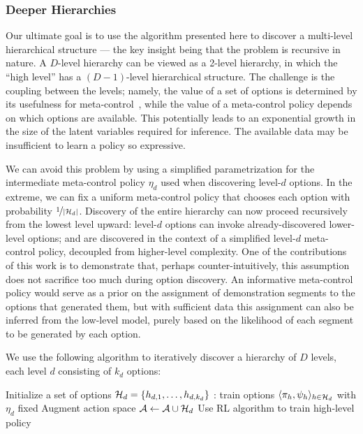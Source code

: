 \subsubsection{Deeper Hierarchies}
Our ultimate goal is to use the algorithm presented here to discover a multi-level hierarchical structure --- the key insight being that the problem is recursive in nature.
A $D$-level hierarchy can be viewed as a 2-level hierarchy, in which the ``high level'' has a $(D-1)$-level hierarchical structure. 
The challenge is the coupling between the levels; namely, the value of a set of options is determined by its usefulness for meta-control~\cite{foxMT16}, while the value of a meta-control policy depends on which options are available. This potentially leads to an exponential growth in the size of the latent variables required for inference.
The available data may be insufficient to learn a policy so expressive.

We can avoid this problem by using a simplified parametrization for the intermediate meta-control policy $\eta_d$ used when discovering level-$d$ options. In the extreme, we can fix a uniform meta-control policy that chooses each option with probability $\nicefrac 1 {|\mathcal{H}_d|}$. Discovery of the entire hierarchy can now proceed recursively from the lowest level upward: level-$d$ options can invoke already-discovered lower-level options; and are discovered in the context of a simplified level-$d$ meta-control policy, decoupled from higher-level complexity.
One of the contributions of this work is to demonstrate that, perhaps counter-intuitively, this assumption does not sacrifice too much during option discovery.
An informative meta-control policy would serve as a prior on the assignment of demonstration segments to the options that generated them, but with sufficient data this assignment can also be inferred from the low-level model, purely based on the likelihood of each segment to be generated by each option.

We use the following algorithm to iteratively discover a hierarchy of $D$ levels, each level $d$ consisting of $k_d$ options:
\begin{algorithmic}
        \State Initialize a set of options $\mathcal{H}_d=\{h_{d,1},\ldots,h_{d,k_d}\}$
        \State \alg: train options $\langle \pi_h, \psi_h \rangle_{h\in\mathcal{H}_d}$ with $\eta_d$ fixed
        \State Augment action space $\mathcal{A} \gets \mathcal{A} \cup \mathcal{H}_d$
    \EndFor
    \State Use RL algorithm to train high-level policy
\end{algorithmic}

